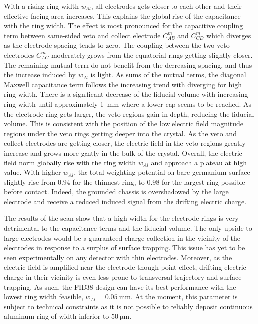With a rising ring width $w_{Al}$, all electrodes gets closer to each other and their effective facing area increases. This explains the global rise of the capacitance with the ring width. The effect is most pronounced for the capacitive coupling term between same-sided veto and collect electrode $C_{AB}^m$ and $C_{CD}^m$ which diverges as the electrode spacing tends to zero. The coupling between the two veto electrodes $C_{AC}^m$ moderately grows from the equatorial rings getting slightly closer. The remaining mutual term do not benefit from the decreasing spacing, and thus the increase induced by $w_{Al}$ is light. As sums of the mutual terms, the diagonal Maxwell capacitance term follows the increasing trend with diverging for high ring width.
There is a significant decrease of the fiducial volume with increasing ring width until approximately \SI{1}{\mm} where a lower cap seems to be reached. As the electrode ring gets larger, the veto regions gain in depth, reducing the fiducial volume. 
This is consistent with the position of the low electric field magnitude regions under the veto rings getting deeper into the crystal. As the veto and collect electrodes are getting closer, the electric field in the veto regions greatly increase and grows more gently in the bulk of the crystal. Overall, the electric field norm globally rise with the ring width $w_{Al}$ and approach a plateau at high value. 
With higher $w_{Al}$, the total weighting potential on bare germanium surface slightly rise from $0.94$ for the thinnest ring, to $0.98$ for the largest ring possible before contact. Indeed, the grounded chassis is overshadowed by the large electrode and receive a reduced induced signal from the drifting electric charge.

The results of the scan show that a high width for the electrode rings is very detrimental to the capacitance terms and the fiducial volume. The only upside to large electrodes would be a guaranteed charge collection in the vicinity of the electrodes in response to a surplus of surface trapping. This issue has yet to be seen experimentally on any detector with thin electrodes. Moreover, as the electric field is amplified near the electrode though point effect, drifting electric charge in their vicinity is even less prone to transversal trajectory and surface trapping. As such, the FID38 design can have its best performance with the lowest ring width feasible, $w_{Al}=\SI{0.05}{\mm}$. At the moment, this parameter is subject to technical constraints as it is not possible to reliably deposit continuous aluminum ring of width inferior to $\SI{50}{\micro\meter}$. 


